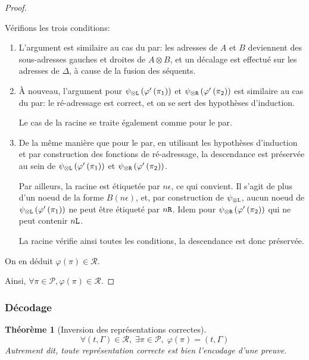 \documentclass[11pt,a4paper]{article}
\theoremstyle{plain}
\newtheorem{theorem}{Théorème}
\theoremstyle{definition}
\theoremstyle{remark}
\newcommand*{\tensor}{\otimes}
\newcommand*{\someproof}{\pi}
\newcommand*{\sequent}{\Gamma}
\newcommand*{\sequentbis}{\Delta}
\newcommand*{\Left}{\textnormal{\texttt{L}}}
\newcommand*{\Right}{\textnormal{\texttt{R}}}
\newcommand*{\proofs}{\ensuremath{\mathcal{P}}}
\newcommand*{\representations}{\ensuremath{\mathcal{R}}}
\newcommand*{\encode}{\ensuremath{\varphi}}
\begin{document}
\begin{proof}
\begin{description}
    Vérifions les trois conditions:
    \begin{enumerate}
        \item L'argument est similaire au cas du par: les adresses de $A$ et $B$ deviennent des sous-adresses gauches et droites de $A \tensor B$, et un décalage est effectué sur les adresses de $\sequentbis$, à cause de la fusion des séquents.

        \item À nouveau, l'argument pour $\psi_{\tensor\Left} \left( \encode' \left( \pi_1 \right) \right)$ et $\psi_{\tensor\Right} \left( \encode' \left( \pi_2 \right) \right)$ est similaire au cas du par: le ré-adressage est correct, et on se sert des hypothèses d'induction.
        
        Le cas de la racine se traite également comme pour le par.

        \item De la même manière que pour le par, en utilisant les hypothèses d'induction et par construction des fonctions de ré-adressage, la descendance est préservée au sein de $\psi_{\tensor\Left} \left( \encode' \left( \pi_1 \right) \right)$ et $\psi_{\tensor\Right} \left( \encode' \left( \pi_2 \right) \right)$.

        Par ailleurs, la racine est étiquetée par $n \epsilon$, ce qui convient. Il s'agit de plus d'un noeud de la forme $B(n \epsilon)$, et, par construction de $\psi_{\tensor\Left}$, aucun noeud de $\psi_{\tensor\Left} \left( \encode' \left( \pi_1 \right) \right)$ ne peut être étiqueté par $n \Right$. Idem pour $\psi_{\tensor\Right} \left( \encode' \left( \pi_2 \right) \right)$ qui ne peut contenir $n \Left$.

        La racine vérifie ainsi toutes les conditions, la descendance est donc préservée.
    \end{enumerate}

    On en déduit $\encode \left( \someproof \right) \in \representations$.
    \end{description}

    Ainsi, $\forall \someproof \in \proofs, \encode \left( \someproof \right) \in \representations$.
\end{proof}

\subsubsection{Décodage}

\begin{theorem}[Inversion des représentations correctes]
\begin{equation*}
\forall (t, \sequent) \in \representations, \; \exists \someproof \in \proofs, \; \encode \left( \someproof \right) = (t, \sequent)
\end{equation*}
Autrement dit, toute représentation correcte est bien l'encodage d'une preuve.
\end{theorem}
\end{document}
